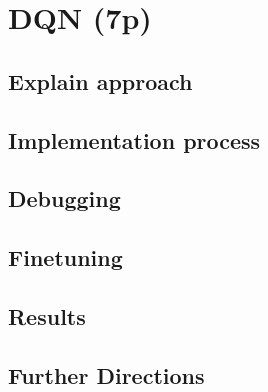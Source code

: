 \section{DQN (7p)}

\subsection{Explain approach}

\subsection{Implementation process}


\subsection{Debugging}

\subsection{Finetuning}

\subsection{Results}

\subsection{Further Directions}

